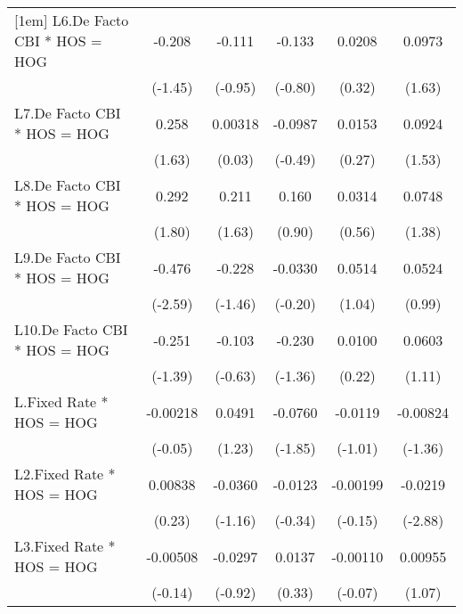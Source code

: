 {\begin{longtable}{l*{5}{c}}
[1em]
L6.De Facto CBI * HOS = HOG&   -0.208         &   -0.111         &   -0.133         &   0.0208         &   0.0973         \\
                &  (-1.45)         &  (-0.95)         &  (-0.80)         &   (0.32)         &   (1.63)         \\
[1em]
L7.De Facto CBI * HOS = HOG&    0.258         &  0.00318         &  -0.0987         &   0.0153         &   0.0924         \\
                &   (1.63)         &   (0.03)         &  (-0.49)         &   (0.27)         &   (1.53)         \\
[1em]
L8.De Facto CBI * HOS = HOG&    0.292         &    0.211         &    0.160         &   0.0314         &   0.0748         \\
                &   (1.80)         &   (1.63)         &   (0.90)         &   (0.56)         &   (1.38)         \\
[1em]
L9.De Facto CBI * HOS = HOG&   -0.476\sym{*}  &   -0.228         &  -0.0330         &   0.0514         &   0.0524         \\
                &  (-2.59)         &  (-1.46)         &  (-0.20)         &   (1.04)         &   (0.99)         \\
[1em]
L10.De Facto CBI * HOS = HOG&   -0.251         &   -0.103         &   -0.230         &   0.0100         &   0.0603         \\
                &  (-1.39)         &  (-0.63)         &  (-1.36)         &   (0.22)         &   (1.11)         \\
[1em]
L.Fixed Rate * HOS = HOG& -0.00218         &   0.0491         &  -0.0760         &  -0.0119         & -0.00824         \\
                &  (-0.05)         &   (1.23)         &  (-1.85)         &  (-1.01)         &  (-1.36)         \\
[1em]
L2.Fixed Rate * HOS = HOG&  0.00838         &  -0.0360         &  -0.0123         & -0.00199         &  -0.0219\sym{**} \\
                &   (0.23)         &  (-1.16)         &  (-0.34)         &  (-0.15)         &  (-2.88)         \\
[1em]
L3.Fixed Rate * HOS = HOG& -0.00508         &  -0.0297         &   0.0137         & -0.00110         &  0.00955         \\
                &  (-0.14)         &  (-0.92)         &   (0.33)         &  (-0.07)         &   (1.07)         \\
[1em]

\end{longtable}}
